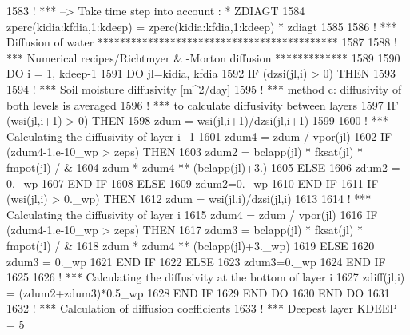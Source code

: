 \begin{DoxyCode}
1583 \textcolor{comment}{! *** --> Take time step into account : * ZDIAGT}
1584   zperc(kidia:kfdia,1:kdeep) = zperc(kidia:kfdia,1:kdeep) * zdiagt
1585 
1586 \textcolor{comment}{! *** Diffusion of water *******************************************}
1587 
1588 \textcolor{comment}{! *** Numerical recipes/Richtmyer & -Morton diffusion  *************}
1589 
1590   \textcolor{keywordflow}{DO} i = 1, kdeep-1
1591     \textcolor{keywordflow}{DO} jl=kidia, kfdia
1592       \textcolor{keywordflow}{IF} (dzsi(jl,i) > 0) \textcolor{keywordflow}{THEN}
1593 
1594 \textcolor{comment}{!       ***  Soil moisture diffusivity [m^2/day]}
1595 \textcolor{comment}{!       ***  method c: diffusivity of both levels is averaged}
1596 \textcolor{comment}{!       ***            to calculate diffusivity between layers}
1597         \textcolor{keywordflow}{IF} (wsi(jl,i+1) > 0) \textcolor{keywordflow}{THEN}
1598           zdum = wsi(jl,i+1)/dzsi(jl,i+1)
1599 
1600 \textcolor{comment}{!         *** Calculating the diffusivity of layer i+1}
1601           zdum4 = zdum / vpor(jl)
1602           \textcolor{keywordflow}{IF} (zdum4-1.e-10\_wp > zeps) \textcolor{keywordflow}{THEN}
1603             zdum2 = bclapp(jl) * fksat(jl) * fmpot(jl) /  &
1604                 zdum * zdum4 ** (bclapp(jl)+3.)
1605           \textcolor{keywordflow}{ELSE}
1606             zdum2 = 0.\_wp
1607 \textcolor{keywordflow}{          END IF}
1608         \textcolor{keywordflow}{ELSE}
1609           zdum2=0.\_wp
1610 \textcolor{keywordflow}{        END IF}
1611         \textcolor{keywordflow}{IF} (wsi(jl,i) > 0.\_wp) \textcolor{keywordflow}{THEN}
1612           zdum = wsi(jl,i)/dzsi(jl,i)
1613 
1614 \textcolor{comment}{!         *** Calculating the diffusivity of layer i}
1615           zdum4 = zdum / vpor(jl)
1616           \textcolor{keywordflow}{IF} (zdum4-1.e-10\_wp > zeps) \textcolor{keywordflow}{THEN}
1617             zdum3 = bclapp(jl) * fksat(jl) * fmpot(jl) /  &
1618                 zdum *  zdum4 ** (bclapp(jl)+3.\_wp)
1619           \textcolor{keywordflow}{ELSE}
1620             zdum3 = 0.\_wp
1621 \textcolor{keywordflow}{          END IF}
1622         \textcolor{keywordflow}{ELSE}
1623           zdum3=0.\_wp
1624 \textcolor{keywordflow}{        END IF}
1625 
1626 \textcolor{comment}{!       *** Calculating the diffusivity at the bottom of layer i}
1627         zdiff(jl,i) = (zdum2+zdum3)*0.5\_wp
1628 \textcolor{keywordflow}{      END IF}
1629 \textcolor{keywordflow}{    END DO}
1630 \textcolor{keywordflow}{  END DO}
1631 
1632 \textcolor{comment}{! *** Calculation of diffusion coefficients}
1633 \textcolor{comment}{! *** Deepest layer KDEEP = 5}

\end{DoxyCode}
